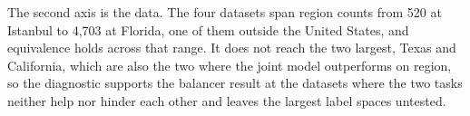 \medskip\noindent
The second axis is the data. The four datasets span region counts from 520 at Istanbul to 4,703 at
Florida, one of them outside the United States, and equivalence holds across that range. It does not
reach the two largest, Texas and California, which are also the two where the joint model outperforms
on region, so the diagnostic supports the balancer result at the datasets where the two tasks neither
help nor hinder each other and leaves the largest label spaces untested.
